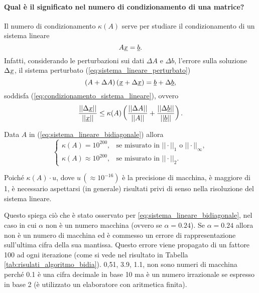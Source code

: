 \paragraph{Qual è il significato nel numero di condizionamento di una matrice?} Il numero di condizionamento $\kappa(A)$ serve per studiare il condizionamento di un sistema lineare
\begin{equation*}
	A\uline x = \uline b.
\end{equation*}
Infatti, considerando le perturbazioni sui dati $\Delta A$ e $\Delta b$, l'errore sulla soluzione $\Delta \uline x$, il sistema perturbato (\ref{eq:sistema_lineare_perturbato})
\begin{equation*}
	\left(A+\Delta A\right)\left(\uline x + \Delta\uline x\right) = \uline b +\Delta\uline b,
\end{equation*}
soddisfa (\ref{eq:condizionamento_sistema_lineare}), ovvero
\begin{equation*}
	\frac{||\Delta \uline x||}{||\uline x||} \leq \kappa(A) \left(\frac{||\Delta  A||}{|| A||} + \frac{||\Delta \uline b||}{||\uline b||}\right).
\end{equation*}
\begin{example}
    Data $A$ in (\ref{eq:sistema_lineare_bidiagonale}) allora
    \begin{equation*}
    	\begin{cases}
    		\kappa(A) = 10^{200}, &\text{se misurato in }||\cdot||_1\text{ o }||\cdot||_\infty,\\
    		\kappa(A)\approx 10^{200}, &\text{se misurato in }||\cdot||_2.
    	\end{cases}
    \end{equation*}

    Poiché $\kappa(A)\cdot u$, dove $u\,(\approx 10^{-16})$ è la precisione di macchina, è maggiore di 1, è necessario aspettarsi (in generale) risultati privi di senso nella risoluzione del sistema lineare.
    
    Questo spiega ciò che è stato osservato per \ref{eq:sistema_lineare_bidiagonale}, nel caso in cui $\alpha$ non è un numero macchina (ovvero se $\alpha=0.24$). Se $\alpha = 0.24$ allora non è un numero di macchina ed è commesso un errore di rappresentazione sull'ultima cifra della sua mantissa. Questo errore viene propagato di un fattore 100 ad ogni iterazione (come si vede nel risultato in Tabella \ref{tab:risulati_algoritmo_bidia}). 0,51, 3.9, 1.1, non sono numeri di macchina perché 0.1 è una cifra decimale in base 10 ma è un numero irrazionale se espresso in base 2 (è utilizzato un elaboratore con aritmetica finita).
\end{example}

